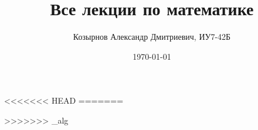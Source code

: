 
\usepackage{newclude}

\title{Все лекции по математике}
\author{Козырнов Александр Дмитриевич, ИУ7-42Б}
\date{\today}



\tableofcontents




















<<<<<<< HEAD
=======



>>>>>>> _alg

